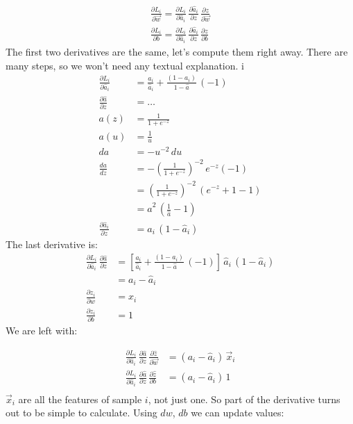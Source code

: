 \begin{align}
  \frac{\partial L_i}{\partial \vec{w}} = 
  \frac{\partial L_i}{\partial \hat{a}_i}\, \frac{\partial \hat{a}_i}{\partial z}\,\frac{\partial z}{\partial \vec{w}}\\
  \frac{\partial L_i}{\partial b} = 
  \frac{\partial L_i}{\partial \hat{a}_i}\,\frac{\partial \hat{a}_i}{\partial z}\,\frac{\partial z}{\partial b}
\end{align}
The first two derivatives are the same, let's compute them right away. There are many steps, so we won't need any textual explanation.
i
\begin{align*}
  \frac{\partial L_i}{\partial \hat{a}_i} &= \frac{a_i}{\hat{a}_i} + \frac{(1-a_i)}{1-\hat{a}}\,(-1) \\
  \frac{\partial \hat{a}}{\partial z} &= \ldots  \label{eq:derZ}\\
  a(z)&= \frac{1}{1+e^{-z}}\\
  a(u)&=\frac{1}{u}\\
  da&=-u^{-2}\,du\\
  \frac{da}{dz}&=-\left(\frac{1}{1+e^{-z}}\right)^{-2}\,e^{-z}(-1)\\
  &=\left(\frac{1}{1+e^{-z}}\right)^{-2}\,(e^{-z} + 1 -1)\\
  &= \hat{a}^2\,(\frac{1}{\hat{a}} -1) \\
  \frac{\partial \hat{a}_i}{\partial z} &= \hat{a}_i\,(1-\hat{a}_i)
\end{align*}
The last derivative is:
\begin{align*}
  \frac{\partial L_i}{\partial \hat{a}_i}\,\frac{\partial \hat{a}}{\partial z} &= \left[ \frac{a_i}{\hat{a}_i} + \frac{(1-a_i)}{1-\hat{a}}\,(-1) \right]\,\hat{a}_i\,(1-\hat{a}_i)\\
  &= a_i - \hat{a}_i\\
  \frac{\partial z_i}{\partial w} &= x_i\\
  \frac{\partial z_i}{\partial b} &= 1
\end{align*}
We are left with:

\begin{align*}
  \frac{\partial L_i}{\partial \hat{a}_i}\,\frac{\partial \hat{a}}{\partial z}\,\frac{\partial \hat{z}}{\partial \vec{w}} &= \left(a_i - \hat{a}_i\right)\,\vec{x}_i\\
  \frac{\partial L_i}{\partial \hat{a}_i}\,\frac{\partial \hat{a}}{\partial z}\,\frac{\partial \hat{z}}{\partial b} &= \left(a_i - \hat{a}_i\right)\,1\\
\end{align*}
$\vec{x}_i$ are all the features of sample $i$, not just one.
So part of the derivative turns out to be simple to calculate. Using $dw$, $db$ we can update values:

